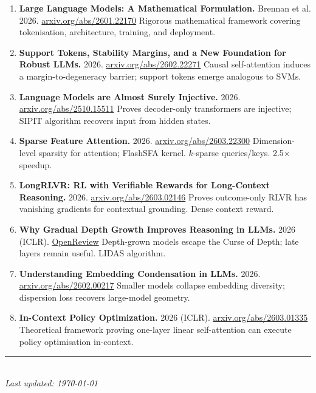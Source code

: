 \documentclass[11pt,a4paper]{article}
\begin{document}
\begin{enumerate}[leftmargin=2em,label=(\arabic*),start=21]
	\item \textbf{Large Language Models: A Mathematical Formulation.} Brennan et al. 2026.
	      \href{https://arxiv.org/abs/2601.22170}{arxiv.org/abs/2601.22170}
	      \newline Rigorous mathematical framework covering tokenisation, architecture, training, and deployment.

	\item \textbf{Support Tokens, Stability Margins, and a New Foundation for Robust LLMs.} 2026.
	      \href{https://arxiv.org/abs/2602.22271}{arxiv.org/abs/2602.22271}
	      \newline Causal self-attention induces a margin-to-degeneracy barrier; support tokens emerge analogous to SVMs.

	\item \textbf{Language Models are Almost Surely Injective.} 2026.
	      \href{https://arxiv.org/abs/2510.15511}{arxiv.org/abs/2510.15511}
	      \newline Proves decoder-only transformers are injective; SIPIT algorithm recovers input from hidden states.

	\item \textbf{Sparse Feature Attention.} 2026.
	      \href{https://arxiv.org/abs/2603.22300}{arxiv.org/abs/2603.22300}
	      \newline Dimension-level sparsity for attention; FlashSFA kernel. $k$-sparse queries/keys. 2.5$\times$ speedup.

	\item \textbf{LongRLVR: RL with Verifiable Rewards for Long-Context Reasoning.} 2026.
	      \href{https://arxiv.org/abs/2603.02146}{arxiv.org/abs/2603.02146}
	      \newline Proves outcome-only RLVR has vanishing gradients for contextual grounding. Dense context reward.

	\item \textbf{Why Gradual Depth Growth Improves Reasoning in LLMs.} 2026 (ICLR).
	      \href{https://openreview.net/pdf?id=UIQCQOQStf}{OpenReview}
	      \newline Depth-grown models escape the Curse of Depth; late layers remain useful. LIDAS algorithm.

	\item \textbf{Understanding Embedding Condensation in LLMs.} 2026.
	      \href{https://arxiv.org/pdf/2602.00217}{arxiv.org/abs/2602.00217}
	      \newline Smaller models collapse embedding diversity; dispersion loss recovers large-model geometry.

	\item \textbf{In-Context Policy Optimization.} 2026 (ICLR).
	      \href{https://arxiv.org/abs/2603.01335}{arxiv.org/abs/2603.01335}
	      \newline Theoretical framework proving one-layer linear self-attention can execute policy optimisation in-context.
\end{enumerate}

\vfill
\begin{center}
	\rule{0.5\textwidth}{0.5pt}\\[0.3cm]
	\textit{Last updated: \today}
\end{center}
\end{document}
